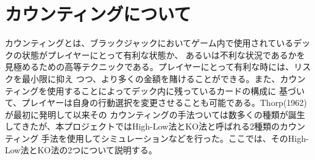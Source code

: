 \section{カウンティングについて}
カウンティングとは、ブラックジャックにおいてゲーム内で使用されているデックの状態がプレイヤーにとって有利な状態か、
あるいは不利な状況であるかを見極めるための高等テクニックである。プレイヤーにとって有利な時には、リスクを最小限に抑え
つつ、より多くの金額を賭けることができる。また、カウンティングを使用することによってデック内に残っているカードの構成に
基づいて、プレイヤーは自身の行動選択を変更させることも可能である。Thorp(1962)が最初に発明して以来その
カウンティングの手法ついては数多くの種類が誕生してきたが、本プロジェクトではHigh-Low法とKO法と呼ばれる2種類のカウンティング
手法を使用してシミュレーションなどを行った。ここでは、そのHigh-Low法とKO法の2つについて説明する。

